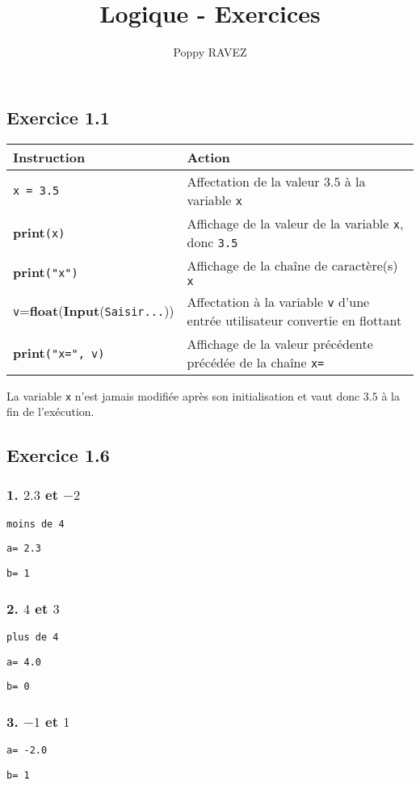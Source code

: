 \documentclass[a4paper,10pt]{report}
\title{Logique - Exercices}
\author{Poppy RAVEZ}
\begin{document}
\subsection*{Exercice 1.1}
\begin{tabular}{|l|l|}
	\hline
	Instruction & Action \\
	\hline
	\texttt{x = 3.5}             & Affectation de la valeur $3.5$ à la variable \texttt{x}  \\
	\hline
	\textbf{print}\texttt{(x)}   & Affichage de la valeur de la variable \texttt{x}, donc \texttt{3.5} \\
	\hline
	\textbf{print}\texttt{("x")} & Affichage de la chaîne de caractère(s) \texttt{x} \\
	\hline
	\texttt{v}=\textbf{float}(\textbf{Input}(\texttt{Saisir...})) & Affectation à la variable \texttt{v} d'une entrée utilisateur convertie en flottant\\
	\hline
	\textbf{print}\texttt{("x=", v)}&  Affichage de la valeur précédente précédée de la chaîne \texttt{x=} \\
	\hline
\end{tabular}

La variable \texttt{x} n'est jamais modifiée après son initialisation et vaut donc $3.5$ à la fin de l'exécution.


\subsection*{Exercice 1.6}
\subsubsection*{1. $2.3$ et $-2$}
\texttt{moins de 4}

\texttt{a= 2.3}

\texttt{b= 1}

\subsubsection*{2. $4$ et $3$}
\texttt{plus de 4}

\texttt{a= 4.0}

\texttt{b= 0}

\subsubsection*{3. $-1$ et $1$}

\texttt{a= -2.0}

\texttt{b= 1}
\end{document}
